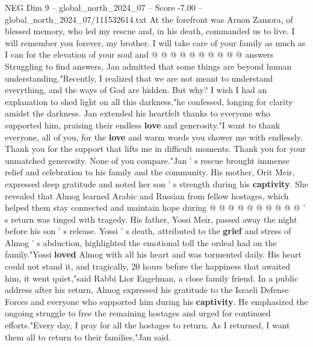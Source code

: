 \begin{textsample}{NEG Dim 9 – global\_north\_2024\_07 – Score -7.00 – global\_north\_2024\_07/111532614.txt}
At the forefront was Arnon Zamora, of blessed memory, who led my rescue and, in his death, commanded us to live.
I will remember you forever, my brother.
I will take care of your family as much as I can for the elevation of your soul and @ @ @ @ @ @ @ @ @ @ answers Struggling to find answers, Jan admitted that some things are beyond human understanding."Recently, I realized that we are not meant to understand everything, and the ways of God are hidden.
But why?
I wish I had an explanation to shed light on all this darkness,"he confessed, longing for clarity amidst the darkness.
Jan extended his heartfelt thanks to everyone who supported him, praising their endless \textbf{love} and generosity."I want to thank everyone, all of you, for the \textbf{love} and warm words you shower me with endlessly.
Thank you for the support that lifts me in difficult moments.
Thank you for your unmatched generosity.
None of you compare."Jan ' s rescue brought immense relief and celebration to his family and the community.
His mother, Orit Meir, expressed deep gratitude and noted her son ' s strength during his \textbf{captivity}.
She revealed that Almog learned Arabic and Russian from fellow hostages, which helped them stay connected and maintain hope during @ @ @ @ @ @ @ @ @ @ ' s return was tinged with tragedy.
His father, Yossi Meir, passed away the night before his son ' s release.
Yossi ' s death, attributed to the \textbf{grief} and stress of Almog ' s abduction, highlighted the emotional toll the ordeal had on the family."Yossi \textbf{loved} Almog with all his heart and was tormented daily.
His heart could not stand it, and tragically, 20 hours before the happiness that awaited him, it went quiet,"said Rabbi Lior Engelman, a close family friend.
In a public address after his return, Almog expressed his gratitude to the Israeli Defense Forces and everyone who supported him during his \textbf{captivity}.
He emphasized the ongoing struggle to free the remaining hostages and urged for continued efforts."Every day, I pray for all the hostages to return.
As I returned, I want them all to return to their families,"Jan said.

\end{textsample}
